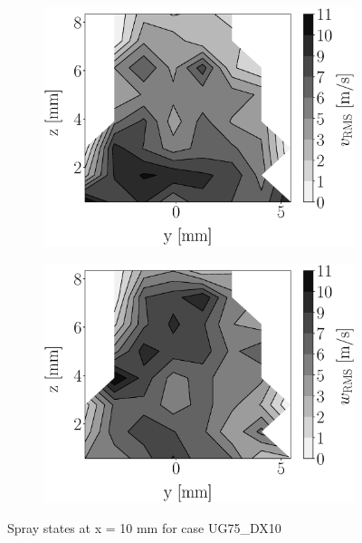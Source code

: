 \begin{figure}[h!]
\begin{subfigure}[b]{0.22\textwidth}
\end{subfigure}
   \hspace{0.17in}
\begin{subfigure}[b]{0.22\textwidth}
	\centering
   \includegraphics[scale=0.17]{./part2_developments/figures_ch5_resolved_JICF/injectors_SLI/uG75_dx10_x10_uy_rms_map.eps}
\end{subfigure}
   \hspace{0.17in}
\begin{subfigure}[b]{0.22\textwidth}
	\centering
   \includegraphics[scale=0.17]{./part2_developments/figures_ch5_resolved_JICF/injectors_SLI/uG75_dx10_x10_uz_rms_map.eps}
\end{subfigure}
\caption{Spray states at x = 10 mm for case UG75\_DX10}
\label{fig:injectors_sli_uG75_dx10_x10}
\end{figure}



